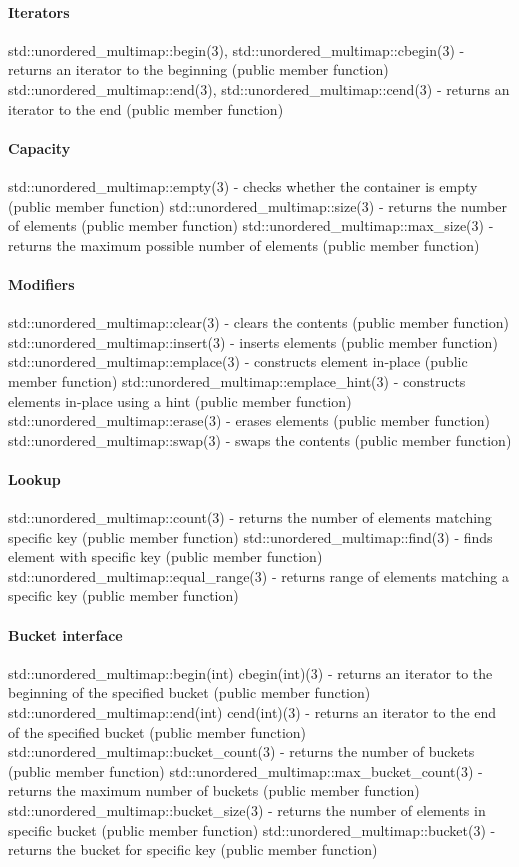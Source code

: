 \paragraph{Iterators}
std::unordered\_multimap::begin(3), std::unordered\_multimap::cbegin(3) - returns an iterator to the beginning   (public member function)
std::unordered\_multimap::end(3), std::unordered\_multimap::cend(3) - returns an iterator to the end   (public member function)
\paragraph{Capacity}
std::unordered\_multimap::empty(3) - checks whether the container is empty   (public member function)
std::unordered\_multimap::size(3) - returns the number of elements   (public member function)
std::unordered\_multimap::max\_size(3) - returns the maximum possible number of elements   (public member function)
\paragraph{Modifiers}
std::unordered\_multimap::clear(3) - clears the contents   (public member function)
std::unordered\_multimap::insert(3) - inserts elements   (public member function)
std::unordered\_multimap::emplace(3) - constructs element in-place   (public member function)
std::unordered\_multimap::emplace\_hint(3) - constructs elements in-place using a hint   (public member function)
std::unordered\_multimap::erase(3) - erases elements   (public member function)
std::unordered\_multimap::swap(3) - swaps the contents   (public member function)
\paragraph{Lookup}
std::unordered\_multimap::count(3) - returns the number of elements matching specific key   (public member function)
std::unordered\_multimap::find(3) - finds element with specific key  (public member function)
std::unordered\_multimap::equal\_range(3) - returns range of elements matching a specific key  (public member function)
\paragraph{Bucket interface}
std::unordered\_multimap::begin(int) cbegin(int)(3) - returns an iterator to the beginning of the specified bucket   (public member function)
std::unordered\_multimap::end(int) cend(int)(3) - returns an iterator to the end of the specified bucket   (public member function)
std::unordered\_multimap::bucket\_count(3) - returns the number of buckets  (public member function)
std::unordered\_multimap::max\_bucket\_count(3) - returns the maximum number of buckets  (public member function)
std::unordered\_multimap::bucket\_size(3) - returns the number of elements in specific bucket  (public member function)
std::unordered\_multimap::bucket(3) - returns the bucket for specific key  (public member function)
